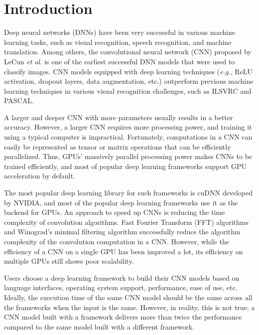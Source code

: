\section{Introduction}
Deep neural networks (DNNs) have been very successful in various machine learning tasks, such as visual recognition\cite{krizhevsky2012imagenet,vgg,RCNN}, speech recognition\cite{speech}, and machine translation\cite{machinetranslation}. Among others, the convolutional neural network (CNN) proposed by LeCun \textit{et al.}\cite{726791} is one of the earliest successful DNN models that were used to classify images. CNN models equipped with deep learning techniques (\textit{e.g.}, ReLU activation, dropout layers, data augmentation, etc.) outperform previous machine learning techniques in various visual recognition challenges, such as ILSVRC\cite{DBLP:journals/corr/RussakovskyDSKSMHKKBBF14} and PASCAL\cite{pascal}.

A larger and deeper CNN with more parameters usually results in a better accuracy. However, a larger CNN requires more processing power, and training it using a typical computer is impractical. Fortunately, computations in a CNN can easily be represented as tensor or matrix operations that can be efficiently parallelized. Thus, GPUs' massively parallel processing power makes CNNs to be trained efficiently, and most of popular deep learning frameworks support GPU acceleration by default\cite{DBLP:journals/corr/Al-RfouAAa16,jia2014caffe,tensorflow2015-whitepaper,torch,cntk}.

The most popular deep learning library for such frameworks is cuDNN\cite{cudnn} developed by NVIDIA, and most of the popular deep learning frameworks use it as the backend for GPUs. An approach to speed up CNNs is reducing the time complexity of convolution algorithms. Fast Fourier Transform (FFT) algorithms\cite{fftconv, fbfft} and Winograd's minimal filtering algorithm\cite{winograd} successfully reduce the algorithm complexity of the convolution computation in a CNN.
However, while the efficiency of a CNN on a single GPU has been improved a lot, its efficiency on multiple GPUs still shows poor scalability\cite{DBLP:journals/corr/YadanATR13}.

Users choose a deep learning framework to build their CNN models based on language interfaces, operating system support, performance, ease of use, etc. Ideally, the execution time of the same CNN model should be the same across all the frameworks when the input is the same. However, in reality, this is not true; a CNN model built with a framework delivers more than twice the performance compared to the same model built with a different framework\cite{DBLP:journals/corr/BahrampourRSS15,DBLP:journals/corr/ShiWXC16}. 

